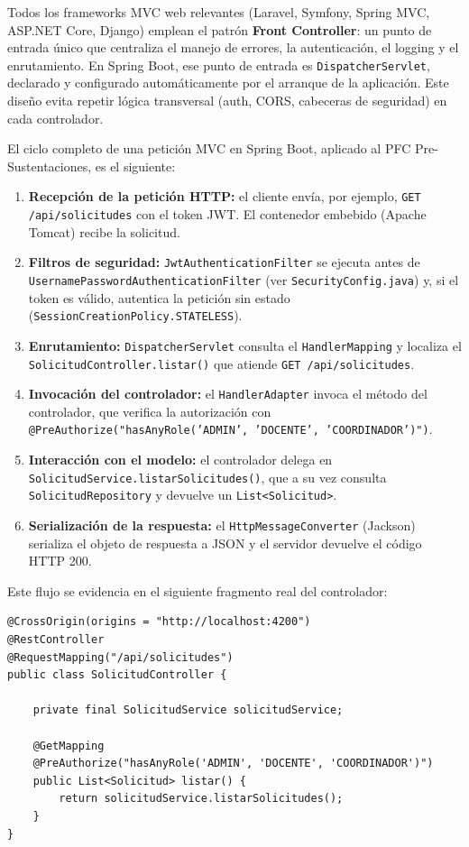 Todos los frameworks MVC web relevantes (Laravel, Symfony, Spring MVC, ASP.NET Core, Django) emplean el patrón
\textbf{Front Controller}: un punto de entrada único que centraliza el manejo de errores, la autenticación, el
logging y el enrutamiento. En Spring Boot, ese punto de entrada es \texttt{DispatcherServlet}, declarado y
configurado automáticamente por el arranque de la aplicación. Este diseño evita repetir lógica transversal
(auth, CORS, cabeceras de seguridad) en cada controlador.

El ciclo completo de una petición MVC en Spring Boot, aplicado al PFC Pre-Sustentaciones, es el siguiente:

\begin{enumerate}[label=\textbf{Paso \arabic*.}]
    \item \textbf{Recepción de la petición HTTP:} el cliente envía, por ejemplo, \texttt{GET /api/solicitudes}
    con el token JWT. El contenedor embebido (Apache Tomcat) recibe la solicitud.
    \item \textbf{Filtros de seguridad:} \texttt{JwtAuthenticationFilter} se ejecuta antes de
    \texttt{UsernamePasswordAuthenticationFilter} (ver \texttt{SecurityConfig.java}) y, si el token es válido,
    autentica la petición sin estado (\texttt{SessionCreationPolicy.STATELESS}).
    \item \textbf{Enrutamiento:} \texttt{DispatcherServlet} consulta el \texttt{HandlerMapping} y localiza el
    \texttt{SolicitudController.listar()} que atiende \texttt{GET /api/solicitudes}.
    \item \textbf{Invocación del controlador:} el \texttt{HandlerAdapter} invoca el método del controlador,
    que verifica la autorización con \texttt{@PreAuthorize("hasAnyRole('ADMIN', 'DOCENTE', 'COORDINADOR')")}.
    \item \textbf{Interacción con el modelo:} el controlador delega en \texttt{SolicitudService.listarSolicitudes()},
    que a su vez consulta \texttt{SolicitudRepository} y devuelve un \texttt{List<Solicitud>}.
    \item \textbf{Serialización de la respuesta:} el \texttt{HttpMessageConverter} (Jackson) serializa el objeto de
    respuesta a JSON y el servidor devuelve el código HTTP 200.
\end{enumerate}

Este flujo se evidencia en el siguiente fragmento real del controlador:

\begin{lstlisting}[style=javaStyle, label=lst:c1, caption={SolicitudController.java — endpoint GET /api/solicitudes}]
@CrossOrigin(origins = "http://localhost:4200")
@RestController
@RequestMapping("/api/solicitudes")
public class SolicitudController {

    private final SolicitudService solicitudService;

    @GetMapping
    @PreAuthorize("hasAnyRole('ADMIN', 'DOCENTE', 'COORDINADOR')")
    public List<Solicitud> listar() {
        return solicitudService.listarSolicitudes();
    }
}
\end{lstlisting}


